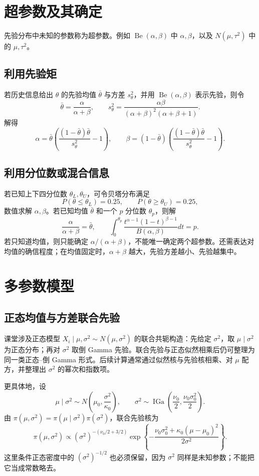 \section{超参数及其确定}
先验分布中未知的参数称为超参数。例如 $\operatorname{Be}(\alpha,\beta)$ 中 $\alpha,\beta$，以及 $N(\mu,\tau^2)$ 中的 $\mu,\tau^2$。

\subsection{利用先验矩}
若历史信息给出 $\theta$ 的先验均值 $\bar\theta$ 与方差 $s_\theta^2$，并用 $\operatorname{Be}(\alpha,\beta)$ 表示先验，则令
\[
\bar\theta=\frac{\alpha}{\alpha+\beta},\qquad
s_\theta^2=\frac{\alpha\beta}{(\alpha+\beta)^2(\alpha+\beta+1)}.
\]
解得
\[
\alpha=\bar\theta\left(\frac{(1-\bar\theta)\bar\theta}{s_\theta^2}-1\right),\qquad
\beta=(1-\bar\theta)\left(\frac{(1-\bar\theta)\bar\theta}{s_\theta^2}-1\right).
\]

\subsection{利用分位数或混合信息}
若已知上下四分位数 $\theta_L,\theta_U$，可令贝塔分布满足
\[
P(\theta\leq\theta_L)=0.25,\qquad P(\theta\geq\theta_U)=0.25,
\]
数值求解 $\alpha,\beta$。若已知均值 $\bar\theta$ 和一个 $p$ 分位数 $\theta_p$，则解
\[
\frac{\alpha}{\alpha+\beta}=\bar\theta,\qquad
\int_0^{\theta_p}\frac{t^{\alpha-1}(1-t)^{\beta-1}}{B(\alpha,\beta)}dt=p.
\]
若只知道均值，则只能确定 $\alpha/(\alpha+\beta)$，不能唯一确定两个超参数。还需表达对均值的确信程度；在均值固定时，$\alpha+\beta$ 越大，先验方差越小、先验越集中。

\section{多参数模型}
\subsection{正态均值与方差联合先验}
课堂涉及正态模型 $X_i\mid\mu,\sigma^2\sim N(\mu,\sigma^2)$ 的联合共轭构造：先给定 $\sigma^2$，取 $\mu\mid\sigma^2$ 为正态分布；再对 $\sigma^2$ 取倒 Gamma 先验。联合先验与正态似然相乘后仍可整理为同一类正态--倒 Gamma 形式。后续计算通常通过似然核与先验核相乘、对 $\mu$ 配方，并整理出 $\sigma^2$ 的幂次和指数项。

更具体地，设
\[
\mu\mid\sigma^2\sim N\left(\mu_0,\frac{\sigma^2}{\kappa_0}\right),\qquad
\sigma^2\sim\operatorname{IGa}\left(\frac{\nu_0}{2},\frac{\nu_0\sigma_0^2}{2}\right).
\]
由 $\pi(\mu,\sigma^2)=\pi(\mu\mid\sigma^2)\pi(\sigma^2)$，联合先验核为
\[
\pi(\mu,\sigma^2)\propto(\sigma^2)^{-(\nu_0/2+3/2)}
\exp\left\{-\frac{\nu_0\sigma_0^2+\kappa_0(\mu-\mu_0)^2}{2\sigma^2}\right\}.
\]
这里条件正态密度中的 $(\sigma^2)^{-1/2}$ 也必须保留，因为 $\sigma^2$ 同样是未知参数；不能把它当成常数略去。


